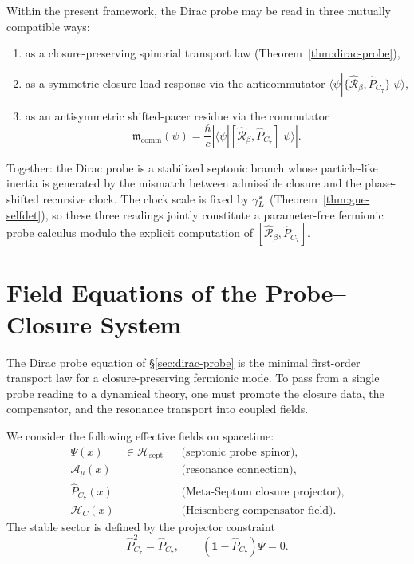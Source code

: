 \begin{proposition}
\label{prop:three-compatible-readings}
Within the present framework, the Dirac probe may be read in three
mutually compatible ways:
\begin{enumerate}[label=(\roman*)]
  \item as a closure-preserving spinorial transport law
        (Theorem~\ref{thm:dirac-probe}),
  \item as a symmetric closure-load response via the anticommutator
        $\langle\psi|\{\hat{\mathcal{R}}_\beta,\hat P_{C_7}\}|\psi\rangle$,
  \item as an antisymmetric shifted-pacer residue via the commutator
        \[
          \mathfrak{m}_{\mathrm{comm}}(\psi)
          = \frac{\hbar}{c}
            \left|\langle\psi|
            [\hat{\mathcal{R}}_\beta,\hat P_{C_7}]|\psi\rangle
            \right|.
        \]
\end{enumerate}
Together: the Dirac probe is a stabilized septonic branch whose
particle-like inertia is generated by the mismatch between admissible
closure and the phase-shifted recursive clock.
The clock scale is fixed by $\gamma_L^*$ (Theorem~\ref{thm:gue-selfdet}),
so these three readings jointly constitute a parameter-free fermionic
probe calculus modulo the explicit computation of
$[\hat{\mathcal{R}}_\beta,\hat P_{C_7}]$.
\end{proposition}



\section{Field Equations of the Probe--Closure System}
\label{sec:field-eq}

\begin{remark}
The Dirac probe equation of \S\ref{sec:dirac-probe} is the minimal
first-order transport law for a closure-preserving fermionic mode.
To pass from a single probe reading to a dynamical theory, one must
promote the closure data, the compensator, and the resonance transport
into coupled fields.
\end{remark}

\begin{definition}
We consider the following effective fields on spacetime:
\begin{align*}
  \Psi(x) &\in \mathcal H_{\mathrm{sept}}
    &&\text{(septonic probe spinor)},\\
  \mathcal A_\mu(x)
    &&&\text{(resonance connection)},\\
  \hat P_{C_7}(x)
    &&&\text{(Meta-Septum closure projector)},\\
  \mathcal H_C(x)
    &&&\text{(Heisenberg compensator field)}.
\end{align*}
The stable sector is defined by the projector constraint
\[
  \hat P_{C_7}^2 = \hat P_{C_7},
  \qquad
  (\mathbf 1-\hat P_{C_7})\Psi = 0.
\]
\end{definition}

